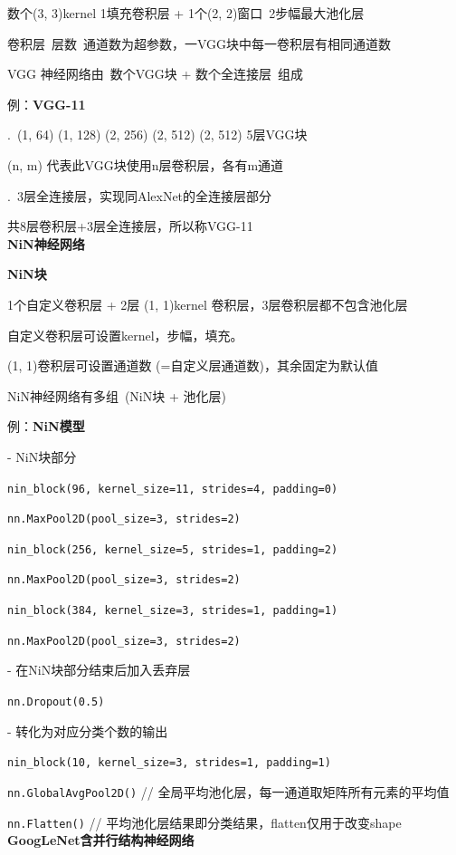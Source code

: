 \documentclass[UTF8]{ctexart}
\begin{document}
  \quad 数个(3, 3)kernel 1填充卷积层 + 1个(2, 2)窗口\ 2步幅最大池化层

  \quad 卷积层\ 层数\ 通道数为超参数，一VGG块中每一卷积层有相同通道数

  VGG 神经网络由\ 数个VGG块 + 数个全连接层\ 组成

  例：\textbf{VGG-11}
  
  .\ (1, 64) (1, 128) (2, 256) (2, 512) (2, 512) 5层VGG块

  \quad \quad (n, m) 代表此VGG块使用n层卷积层，各有m通道
  
  .\ 3层全连接层，实现同AlexNet的全连接层部分
  
  \quad 共8层卷积层+3层全连接层，所以称VGG-11\\
\textbf{NiN神经网络}

  \textbf{NiN块}

  \quad 1个自定义卷积层 + 2层 (1, 1)kernel 卷积层，3层卷积层都不包含池化层

  \quad 自定义卷积层可设置kernel，步幅，填充。
  
  \quad (1, 1)卷积层可设置通道数 (=自定义层通道数)，其余固定为默认值

  NiN神经网络有多组\ (NiN块 + 池化层)
  
  例：\textbf{NiN模型}

  \quad - NiN块部分

  \quad \texttt{nin\_block(96, kernel\_size=11, strides=4, padding=0)}

  \quad \texttt{nn.MaxPool2D(pool\_size=3, strides=2)}

  \quad \texttt{nin\_block(256, kernel\_size=5, strides=1, padding=2)}

  \quad \texttt{nn.MaxPool2D(pool\_size=3, strides=2)}

  \quad \texttt{nin\_block(384, kernel\_size=3, strides=1, padding=1)}

  \quad \texttt{nn.MaxPool2D(pool\_size=3, strides=2)}

  \quad - 在NiN块部分结束后加入丢弃层

  \quad \texttt{nn.Dropout(0.5)}

  \quad - 转化为对应分类个数的输出

  \quad \texttt{nin\_block(10, kernel\_size=3, strides=1, padding=1)}

  \quad \texttt{nn.GlobalAvgPool2D()} // 全局平均池化层，每一通道取矩阵所有元素的平均值

  \quad \texttt{nn.Flatten()} // 平均池化层结果即分类结果，flatten仅用于改变shape\\
\textbf{GoogLeNet含并行结构神经网络}
\end{document}
